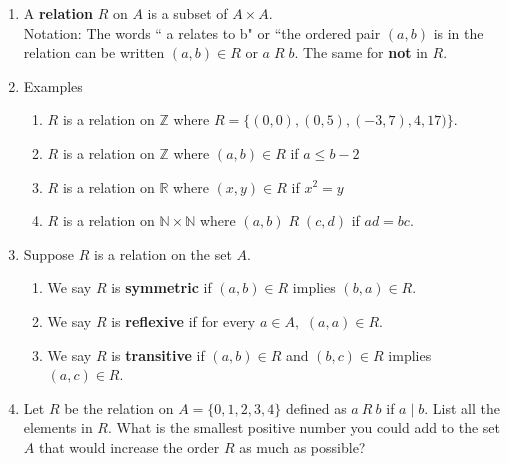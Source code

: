 \documentclass[12pt]{article}
\renewcommand{\emph}[1]{\textsf{\textbf{#1}}}
\newcommand{\N}{\mathbb{N}}
\newcommand{\Z}{\mathbb{Z}}
\newcommand{\R}{\mathbb{R}}
\begin{document}
\begin{enumerate}
\item A \emph{relation} $R$ on $A$ is a subset of $A \times A.$ \\
Notation: The words `` a relates to  b" or ``the ordered pair $(a,b)$ is in the relation can be written $(a,b) \in R$ or $a \; R \; b$. The same for \emph{not} in $R.$\\
\vfill

\item Examples\\
	\begin{enumerate}
	\item $R$ is a relation on $\Z$ where $R=\{(0,0), (0,5), (-3,7), 4,17)\}.$\\
	\item $R$ is a relation on $\Z$ where $(a,b) \in R$ if $a \leq b-2$\\
	\item $R$ is a relation on $\R$ where $(x,y) \in R$ if $x^2=y$\\
	\item $R$ is a relation on $\N \times \N$ where $(a,b) \; R \; (c,d)$ if $ad=bc.$
	\end{enumerate}
	
\item Suppose $R$ is a relation on the set $A.$
	\begin{enumerate}
	\item We say $R$ is \emph{symmetric} if $(a,b) \in R$ implies $(b,a) \in R.$
	\vfill

	\item We say $R$ is \emph{reflexive} if for every $a \in A,$ $(a,a) \in R.$
	\vfill

	\item We say $R$ is \emph{transitive} if $(a,b) \in R$ and $(b,c) \in R$ implies $(a,c) \in R.$
	\vfill
	\end{enumerate}

\item Let $R$ be the relation on $A=\{0,1,2,3,4\}$ defined as $a\: R \: b$ if $a \mid b.$ List all the elements in $R$. What is the smallest positive number you could add to the set $A$ that would increase the order $R$ as much as possible?\\


\end{enumerate}
\end{document}
